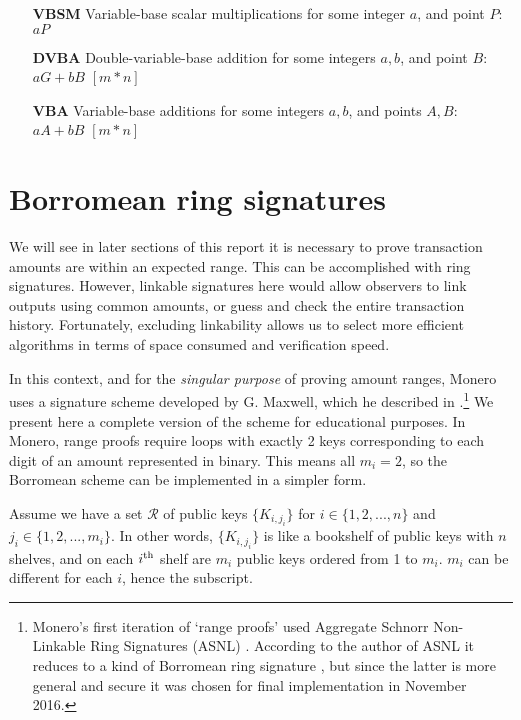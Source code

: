 \begin{itemize}
    \setlength\itemsep{\listspace}
    \item [\textbf{VBSM}] Variable-base scalar multiplications for some integer $a$, and point $P$: $a P$ \quad [m]
    \item [\textbf{DVBA}] Double-variable-base addition for some integers $a, b$, and point $B$: $a G + b B$ \quad \([m*n]\)
    \item [\textbf{VBA}] Variable-base additions for some integers $a, b$, and points $A, B$: $a A + b B$ \quad \([m*n]\)
\end{itemize}


\section{Borromean ring signatures}
\label{sec:borromean}

We will see in later sections of this report it is necessary to prove transaction amounts are within an expected range. This can be accomplished with ring signatures. However, linkable signatures here would allow observers to link outputs using common amounts, or guess and check the entire transaction history. Fortunately, excluding linkability allows us to select more efficient algorithms in terms of space consumed and verification speed.

In this context, and for the {\em singular purpose} of proving amount ranges, Monero uses a signature scheme developed by G. Maxwell, which he described in \cite{Signatures2015BorromeanRS}.\footnote{\label{asnl_note}Monero’s first iteration of `range proofs’ used Aggregate Schnorr Non-Linkable Ring Signatures (ASNL) \cite{ledger34}. According to the author of ASNL it reduces to a kind of Borromean ring signature \cite{ASNL-issue}, but since the latter is more general and secure it was chosen for final implementation in November 2016.} We present here a complete version of the scheme for educational purposes. In Monero, range proofs require loops with exactly 2 keys corresponding to each digit of an amount represented in binary. This means all $m_i = 2$, so the Borromean scheme can be implemented in a simpler form.

Assume we have a set $\mathcal{R}$ of public keys $\{K_{i,j_i}\}$ for $i \in \{1,2,...,n\}$ and $j_i \in \{1, 2, ..., m_i\}$. In other words, $\{K_{i,j_i}\}$ is like a bookshelf of public keys with $n$ shelves, and on each $i\textsuperscript{th}$ shelf are $m_i$ public keys ordered from 1 to $m_i$. $m_i$ can be different for each $i$, hence the subscript.

